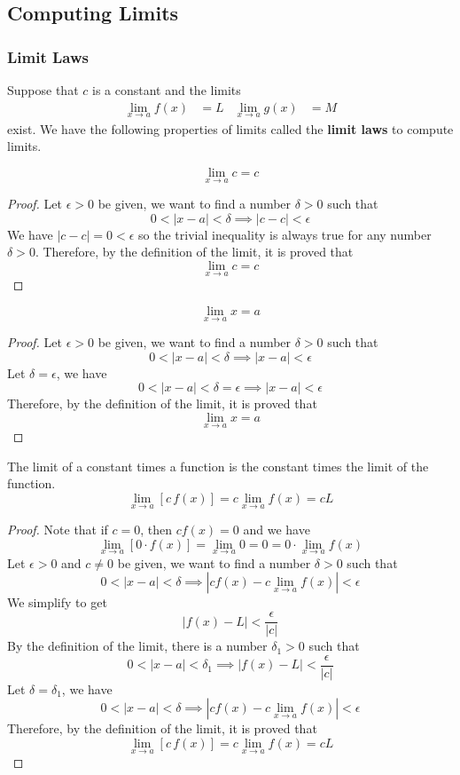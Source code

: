 \subsection{Computing Limits}

\subsubsection{Limit Laws}
Suppose that \(c\) is a constant and the limits
\begin{align*}
    \lim_{x\to a}f(x)&=L&\lim_{x\to a}g(x)&=M
\end{align*}
exist.
We have the following properties of limits called the \textbf{limit laws} to
compute limits.
\begin{theorem}
    \[\lim_{x\to a}c=c\]
\end{theorem}
\begin{proof}
    Let \(\epsilon>0\) be given, we want to find a number \(\delta>0\) such
    that \[0<|x-a|<\delta\implies|c-c|<\epsilon\]
    We have \(|c-c|=0<\epsilon\) so the trivial inequality is always true for
    any number \(\delta>0\).
    Therefore, by the definition of the limit, it is proved that
    \[\lim_{x\to a}c=c\]
\end{proof}
\begin{theorem}
    \[\lim_{x\to a}x=a\]
\end{theorem}
\begin{proof}
    Let \(\epsilon>0\) be given, we want to find a number \(\delta>0\) such
    that \[0<|x-a|<\delta\implies|x-a|<\epsilon\]
    Let \(\delta=\epsilon\), we have
    \[0<|x-a|<\delta=\epsilon\implies|x-a|<\epsilon\]
    Therefore, by the definition of the limit, it is proved that
    \[\lim_{x\to a}x=a\]
\end{proof}
\begin{theorem}
    The limit of a constant times a function is the constant times the limit
    of the function.
    \[\lim_{x\to a}[c\,f(x)]=c\lim_{x\to a}f(x)=cL\]
\end{theorem}
\begin{proof}
    Note that if \(c=0\), then \(cf(x)=0\) and we have
    \[\lim_{x\to a}[0\cdot f(x)]=\lim_{x\to a}0=0=0\cdot\lim_{x\to a}f(x)\]
    Let \(\epsilon>0\) and \(c\neq0\) be given, we want to find a number
    \(\delta>0\) such that
    \[0<|x-a|<\delta\implies|cf(x)-c\lim_{x\to a}f(x)|<\epsilon\]
    We simplify to get \[|f(x)-L|<\frac{\epsilon}{|c|}\]
    By the definition of the limit, there is a number \(\delta_1>0\) such that
    \[0<|x-a|<\delta_1\implies|f(x)-L|<\frac{\epsilon}{|c|}\]
    Let \(\delta=\delta_1\), we have
    \[0<|x-a|<\delta\implies|cf(x)-c\lim_{x\to a}f(x)|<\epsilon\]
    Therefore, by the definition of the limit, it is proved that
    \[\lim_{x\to a}[c\,f(x)]=c\lim_{x\to a}f(x)=cL\]
\end{proof}
